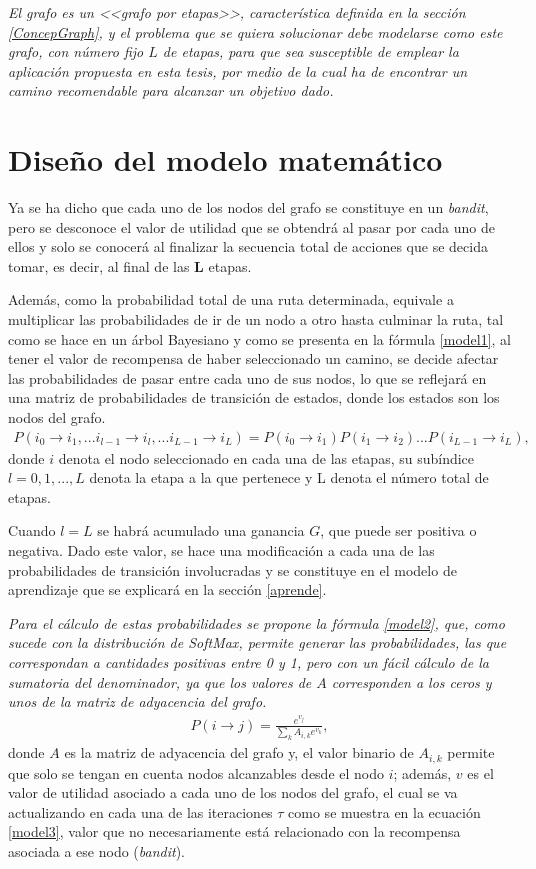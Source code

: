 \textit{El grafo es un <<grafo por etapas>>, característica definida en la sección \ref{ConcepGraph}, y el problema que se quiera solucionar debe modelarse como este grafo, con número fijo $L$ de etapas, para que sea susceptible de emplear la aplicación propuesta en esta tesis, por medio de la cual ha de encontrar un camino recomendable para alcanzar un objetivo dado.}

\section{Diseño del modelo matemático}
\label{mat}
Ya se ha dicho que cada uno de los nodos del grafo se constituye en un \textit{ bandit}, pero se desconoce el valor de utilidad que se obtendrá al pasar por cada uno de ellos y solo se conocerá al finalizar la secuencia total de acciones que se decida tomar, es decir, al final de las \textbf{L} etapas.

Además, como la probabilidad total de una ruta determinada, equivale a multiplicar las probabilidades de ir de un nodo a otro hasta culminar la ruta, tal como se hace en un árbol Bayesiano y como se presenta en la fórmula \ref{model1}, al tener el valor de recompensa de haber seleccionado un camino, se decide afectar las probabilidades de pasar entre cada uno de sus nodos, lo que se reflejará en una matriz de probabilidades de transición de estados, donde los estados son los nodos del grafo.
\begin{eqnarray}\label{model1}
P(i_{0} \to i_{1}, ... i_{l-1} \to i_{l}, ... i_{L-1} \to i_{L})=P(i_{0} \to i_{1})P(i_{1} \to i_{2})...P(i_{L-1} \to i_{L}),
\end{eqnarray}
donde $i$ denota el nodo seleccionado en cada una de las etapas, su subíndice $l=0,1,...,L$ denota la etapa a la que pertenece y L denota el número total de etapas. 

Cuando $l = L$ se habrá acumulado una ganancia $G$, que puede ser positiva o negativa. Dado este valor, se hace una modificación a cada una de las probabilidades de transición involucradas y se constituye en el modelo de aprendizaje que se explicará en la sección \ref{aprende}.

\textit{Para el cálculo de estas probabilidades se propone la fórmula \ref{model2}, que, como sucede con la distribución de \textit{SoftMax}, permite generar las probabilidades, las que correspondan a cantidades positivas entre 0 y 1, pero con un fácil cálculo de la sumatoria del denominador, ya que los valores de $A$ corresponden a los ceros y unos de la matriz de adyacencia del grafo.}
\begin{eqnarray}\label{model2}
P(i \to j) = \frac{e^{v_j}}{\sum_k A_{i,k} e^{v_k}},
\end{eqnarray}
donde $A$ es la matriz de adyacencia del grafo y, el valor binario de $A_{i,k}$ permite que solo se tengan en cuenta nodos alcanzables desde el nodo $i$; además, $v$ es el valor de utilidad asociado a cada uno de los nodos del grafo, el cual se va actualizando en cada una de las iteraciones $\tau$ como se muestra en la ecuación \ref{model3}, valor que no necesariamente está relacionado con la recompensa asociada a ese nodo (\textit{bandit}).

